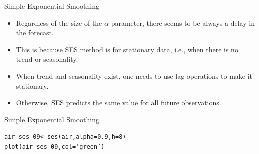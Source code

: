 \documentclass{beamer}\usepackage[]{graphicx}\usepackage[]{color}
\makeatletter
\newcommand{\hlnum}[1]{\textcolor[rgb]{0.824,0.412,0.118}{#1}}%
\newcommand{\hlstr}[1]{\textcolor[rgb]{1,0.894,0.71}{#1}}%
\newcommand{\hlopt}[1]{\textcolor[rgb]{1,0.894,0.769}{#1}}%
\newcommand{\hlstd}[1]{\textcolor[rgb]{1,0.894,0.769}{#1}}%
\newcommand{\hlkwb}[1]{\textcolor[rgb]{0.804,0.776,0.451}{#1}}%
\newcommand{\hlkwc}[1]{\textcolor[rgb]{0.78,0.941,0.545}{#1}}%
\newcommand{\hlkwd}[1]{\textcolor[rgb]{1,0.78,0.769}{#1}}%
\newenvironment{kframe}{%
 \def\at@end@of@kframe{}%
 \ifinner\ifhmode%
  \def\at@end@of@kframe{\end{minipage}}%
  \begin{minipage}{\columnwidth}%
 \fi\fi%
 \def\FrameCommand##1{\hskip\@totalleftmargin \hskip-\fboxsep
 \colorbox{shadecolor}{##1}\hskip-\fboxsep
     \hskip-\linewidth \hskip-\@totalleftmargin \hskip\columnwidth}%
 \MakeFramed {\advance\hsize-\width
   \@totalleftmargin\z@ \linewidth\hsize
   \@setminipage}}%
 {\par\unskip\endMakeFramed%
 \at@end@of@kframe}
\newenvironment{knitrout}{}{} %
\makeatother
\begin{document}
\begin{darkframes}
      
      
      
        
    
    
    \begin{frame}[fragile]{Simple Exponential Smoothing}
     \fontsize{9}{9}\selectfont
      \begin{itemize}[<+->]
        \item Regardless of the size of the $\alpha$ parameter, there seems to be always a delay in the forecast.
        \item This is because SES method is for stationary data, i.e., when there is no trend or seasonality.
        \item When trend and seasonality exist, one needs to use lag operations to make it stationary.
        \item Otherwise, SES predicts the same value for all future observations.
      \end{itemize}
      
    \end{frame} 
    
    
    
    \begin{frame}[fragile]{Simple Exponential Smoothing}
      \fontsize{8}{8}\selectfont
\begin{knitrout}
\begin{kframe}
\begin{alltt}
\hlstd{air_ses_09} \hlkwb{<-} \hlkwd{ses}\hlstd{(air,} \hlkwc{alpha} \hlstd{=} \hlnum{0.9}\hlstd{,} \hlkwc{h}\hlstd{=}\hlnum{8}\hlstd{)}
\hlkwd{plot}\hlstd{(air_ses_09,} \hlkwc{col}\hlstd{=}\hlstr{'green'}\hlstd{)}
\end{alltt}
\end{kframe}



\end{knitrout}
\end{frame}
\end{darkframes}
\end{document}
